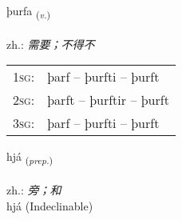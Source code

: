 \documentclass[frontgrid, backgrid]{flacards}\usepackage[]{graphicx}\usepackage[]{xcolor}
\begin{document}
\renewcommand{\blhead}{\vskip5pt {\small\bfseries\footnotesize Sagnorð | 动词 }}
\renewcommand{\bcfoot}{\vskip5pt \hspace{2pt}{\small\bfseries\footnotesize 1K}}


{þurfa \small{\textsubscript{(\textit{v.})}} \\[1ex] %
\textphonetic{[θʏrva]} \\
zh.: \emph{需要；不得不} \\  [2ex]
\renewcommand*{\arraystretch}{0.8}
\begin{tabular}{p{1cm}l}
\textsc{1sg}: & þarf -- þurfti -- þurft \\ 
\textsc{2sg}: & þarft -- þurftir -- þurft \\ 
\textsc{3sg}: & þarf -- þurfti -- þurft \\ 
\end{tabular}
}


\renewcommand{\flhead}{\vskip5pt \fboxsep=0pt {\small\bfseries\footnotesize Forsetning | 介词}}
\renewcommand{\fcfoot}{\vskip5pt \fboxsep=0pt \hspace{2pt}{\small\bfseries\footnotesize 1K}}

\renewcommand{\blhead}{\vskip5pt {\small\bfseries\footnotesize Forsetning | 介词 }}
\renewcommand{\bcfoot}{\vskip5pt \hspace{2pt}{\small\bfseries\footnotesize 1K}}


{hjá \small{\textsubscript{(\textit{prep.})}} \\[1ex]
\textphonetic{[çauː]} \\
zh.: \emph{旁；和} \\  [2ex]
hjá (Indeclinable)}

\renewcommand{\flhead}{\vskip5pt \fboxsep=0pt {\small\bfseries\footnotesize Nafnorð | 名词}}
\renewcommand{\fcfoot}{\vskip5pt \fboxsep=0pt \hspace{2pt}{\small\bfseries\footnotesize 1K}}

\renewcommand{\blhead}{\vskip5pt {\small\bfseries\footnotesize Nafnorð | 名词 }}
\renewcommand{\bcfoot}{\vskip5pt \hspace{2pt}{\small\bfseries\footnotesize 1K}}
\end{document}
